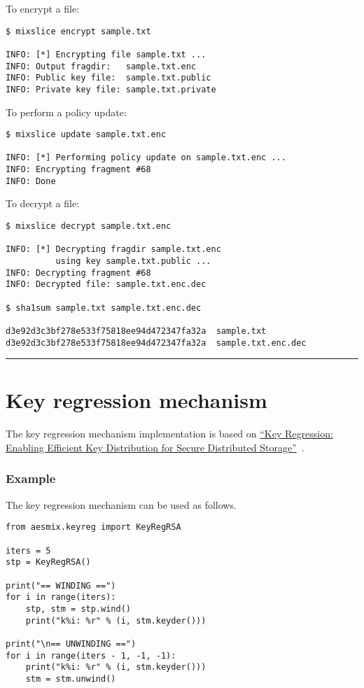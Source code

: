 To encrypt a file:

\begin{verbatim}
$ mixslice encrypt sample.txt

INFO: [*] Encrypting file sample.txt ...
INFO: Output fragdir:   sample.txt.enc
INFO: Public key file:  sample.txt.public
INFO: Private key file: sample.txt.private
\end{verbatim}

To perform a policy update:

\begin{verbatim}
$ mixslice update sample.txt.enc

INFO: [*] Performing policy update on sample.txt.enc ...
INFO: Encrypting fragment #68
INFO: Done
\end{verbatim}

To decrypt a file:

\begin{verbatim}
$ mixslice decrypt sample.txt.enc

INFO: [*] Decrypting fragdir sample.txt.enc
          using key sample.txt.public ...
INFO: Decrypting fragment #68
INFO: Decrypted file: sample.txt.enc.dec

$ sha1sum sample.txt sample.txt.enc.dec

d3e92d3c3bf278e533f75818ee94d472347fa32a  sample.txt
d3e92d3c3bf278e533f75818ee94d472347fa32a  sample.txt.enc.dec
\end{verbatim}

\begin{center}\rule{0.5\linewidth}{\linethickness}\end{center}

\section{Key regression mechanism}\label{key-regression-mechanism}

The key regression mechanism implementation is based on
\href{https://eprint.iacr.org/2005/303.pdf}{``Key Regression: Enabling
Efficient Key Distribution for Secure Distributed Storage''}~\cite{fkk06}.

\subsubsection{Example}

The key regression mechanism can be used as follows.

\begin{verbatim}
from aesmix.keyreg import KeyRegRSA

iters = 5
stp = KeyRegRSA()

print("== WINDING ==")
for i in range(iters):
    stp, stm = stp.wind()
    print("k%i: %r" % (i, stm.keyder()))

print("\n== UNWINDING ==")
for i in range(iters - 1, -1, -1):
    print("k%i: %r" % (i, stm.keyder()))
    stm = stm.unwind()
\end{verbatim}